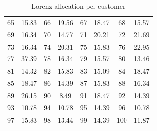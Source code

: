 \begin{table}[H]
\begin{tabular}{c| c |c |c |c|c|c|c}
		65 & 15.83 & 66 & 19.56 & 67 & 18.47 & 68 & 15.57 \\
		69 & 16.34 & 70 & 14.77 & 71 & 20.21 & 72 & 21.69 \\
		73 & 16.34 & 74 & 20.31 & 75 & 15.83 & 76 & 22.95 \\
		77 & 37.39 & 78 & 16.34 & 79 & 15.57 & 80 & 13.46 \\
		81 & 14.32 & 82 & 15.83 & 83 & 15.09 & 84 & 18.47 \\
		85 & 18.47 & 86 & 14.39 & 87 & 15.83 & 88 & 16.34 \\
		89 & 26.15 & 90 & 8.49 & 91 & 18.47 & 92 & 14.39 \\
		93 & 10.78 & 94 & 10.78 & 95 & 14.39 & 96 & 10.78 \\
		97 & 15.83 & 98 & 13.44 & 99 & 14.39 & 100 & 11.87	\\	
		\hline 
	\end{tabular} \
	\caption{Lorenz allocation per customer}
	\label{Lorenz}
\end{table}\

